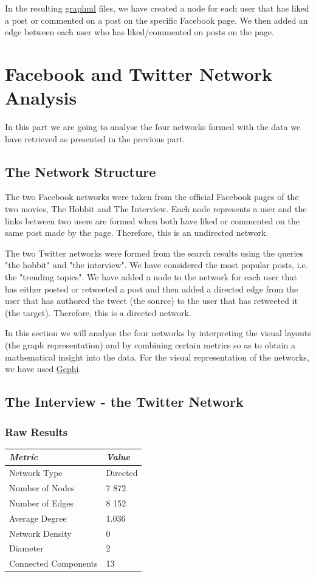 \documentclass{llncs}
\begin{document}
In the resulting \href{http://graphml.graphdrawing.org/}{graphml} files, we have
created a node for each user that has liked a post or commented on a post on the
specific Facebook page. We then added an edge between each user who has
liked/commented on posts on the page.
%
\section{Facebook and Twitter Network Analysis}
In this part we are going to analyse the four networks formed with the data we
have retrieved as presented in the previous part.
%
\subsection{The Network Structure}
The two Facebook networks were taken from the official Facebook pages of the two
movies, The Hobbit and The Interview. Each node represents a user and the
links between two users are formed when both have liked or commented on the same
post made by the page. Therefore, this is an undirected network.

The two Twitter networks were formed from the search results using the queries
"the hobbit" and "the interview". We have considered the most popular posts,
i.e. the "trending topics". We have added a node to the network for each user
that has either posted or retweeted a post and then added a directed edge from
the user that has authored the tweet (the source) to the user that has retweeted
it (the target). Therefore, this is a directed network.

In this section we will analyse the four networks by interpreting the visual
layouts (the graph representation) and by combining certain metrics so as to
obtain a mathematical insight into the data. For the visual representation of
the networks, we have used \href{https://gephi.org/}{Gephi}.
%
\subsection{The Interview - the Twitter Network}
\subsubsection{Raw Results}
\begin{center}
    \begin{tabular}{ l | l }
        \hline
        \textit{Metric} & \textit{Value} \\ \hline
        Network Type & Directed \\ \hline
        Number of Nodes & 7 872 \\ \hline
        Number of Edges & 8 152 \\ \hline
        Average Degree & 1.036 \\ \hline
        Network Density & 0 \\ \hline
        Diameter & 2 \\ \hline
        Connected Components & 13 \\
        \hline
    \end{tabular}
\end{center}
%
\end{document}
